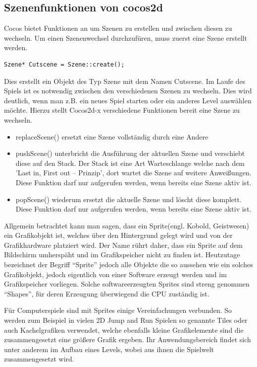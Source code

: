 \subsection{Szenenfunktionen von cocos2d}

Cocos bietet Funktionen an um Szenen zu erstellen und zwischen diesen zu wechseln. Um einen Szenenwechsel durchzufüren, muss zuerst eine Szene erstellt werden.

\begin{lstlisting}[style=singleline]
	Szene* Cutscene = Szene::create();
\end{lstlisting}


Dies erstellt ein Objekt des Typ Szene mit dem Namen Cutscene.
Im Laufe des Spiels ist es  notwendig zwischen den verschiedenen Szenen zu wechseln. Dies wird deutlich, wenn man z.B. ein neues Spiel starten oder ein anderes Level auswählen möchte. Hierzu stellt Cocos2d-x verschiedene Funktionen bereit eine Szene zu wechseln.

\begin{itemize}
\item replaceScene() ersetzt eine Szene vollständig durch eine Andere
\item pushScene() unterbricht die Ausführung der aktuellen Szene und verschiebt diese auf den Stack. Der Stack ist eine Art Warteschlange welche nach dem 'Last in, First out – Prinzip', dort wartet die Szene auf weitere Anweißungen. Diese Funktion darf nur aufgerufen werden, wenn bereits eine Szene aktiv ist.
\item popScene() wiederum ersetzt die aktuelle Szene und löscht diese komplett. Diese Funktion darf nur aufgerufen werden, wenn bereits eine Szene aktiv ist.
\end{itemize}



\label{sec:2_Spriteprinzip}
Allgemein betrachtet kann man sagen, dass ein Sprite(engl. Kobold, Geistwesen) ein Grafikobjekt ist, welches über den Hintergrund gelegt wird und von der Grafikhardware platziert wird. 
Der Name rührt daher, dass ein Sprite auf dem Bildschirm umherspäht und im Grafikspeicher nicht zu finden ist. Heutzutage bezeichnet der Begriff “Sprite” jedoch alle Objekte die so aussehen wie ein solches Grafikobjekt, jedoch eigentlich von einer Software erzeugt werden und im Grafikspeicher vorliegen. 
Solche softwareerzeugten Sprites sind streng genommen “Shapes”, für deren Erzeugung überwiegend die CPU zuständig ist.
 
Für Computerspiele sind mit Sprites einige Vereinfachungen verbunden. So werden zum Beispiel in vielen 2D Jump and Run Spielen so genannte Tiles oder auch Kachelgrafiken verwendet, welche ebenfalls kleine Grafikelemente sind die zusammengesetzt eine größere Grafik ergeben. Ihr Anwendungsbereich findet sich unter anderem im Aufbau eines Levels, wobei aus ihnen die Spielwelt zusammengesetzt wird.

